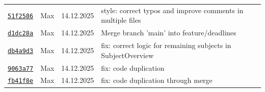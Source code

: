 \documentclass{article}%
\begin{document}
\begin{longtable}{l l l p{12cm}}
\href{https://github.com/scriptor1000/homeworks/pull/15/commits/51f25862b9522cb918d68b8e17fdf5a19b5070a7}{\underline{\texttt{51f2586}}}&Max&14.12.2025&style: correct typos and improve comments in multiple files\\%
\href{https://github.com/scriptor1000/homeworks/pull/15/commits/d1dc28a9d5b844af23d40a9adf88f199963a70c1}{\underline{\texttt{d1dc28a}}}&Max&14.12.2025&Merge branch 'main' into feature/deadlines\\%
\href{https://github.com/scriptor1000/homeworks/pull/15/commits/db4a9d3494355a2fa3db30f53807a7dfbd9373e8}{\underline{\texttt{db4a9d3}}}&Max&14.12.2025&fix: correct logic for remaining subjects in SubjectOverview\\%
\href{https://github.com/scriptor1000/homeworks/pull/15/commits/9063a7762412ddc88357a1776101aa3a05a4fb06}{\underline{\texttt{9063a77}}}&Max&14.12.2025&fix: code duplication\\%
\href{https://github.com/scriptor1000/homeworks/pull/15/commits/fb41f8ec261ce1fbbd0ca4789a980ec16e398938}{\underline{\texttt{fb41f8e}}}&Max&14.12.2025&fix: code duplication through merge\\%
\end{longtable}

%
\end{document}
